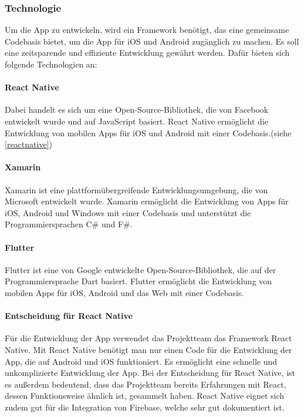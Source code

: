 \subsubsection{Technologie}
Um die App zu entwickeln, wird ein \Gls{Framework} benötigt, das eine gemeinsame Codebasis bietet, um die App für iOS und Android zugänglich zu machen. Es soll eine zeitsparende und effiziente Entwicklung gewährt werden. Dafür bieten sich folgende Technologien an:\\

\paragraph{React Native}Dabei handelt es sich um eine \Gls{Open-Source}-Bibliothek, die von Facebook entwickelt wurde und auf JavaScript basiert. React Native ermöglicht die Entwicklung von mobilen Apps für iOS und Android mit einer Codebasis.(siehe \ref*{reactnative})
\paragraph{Xamarin} Xamarin ist eine plattformübergreifende Entwicklungsumgebung, die von Microsoft entwickelt wurde. Xamarin ermöglicht die Entwicklung von Apps für iOS, Android und Windows mit einer Codebasis und unterstützt die Programmiersprachen C\# und F\#. \cite{vergleich}
\paragraph{Flutter} Flutter ist eine von Google entwickelte \Gls{Open-Source}-Bibliothek, die auf der Programmiersprache Dart basiert. Flutter ermöglicht die Entwicklung von mobilen Apps für iOS, Android und das Web mit einer Codebasis.\cite{flutter}


\paragraph{Entscheidung für React Native}Für die Entwicklung der App verwendet das Projektteam das Framework React Native. Mit React Native benötigt man nur einen Code für die Entwicklung der App, die auf Android und iOS funktioniert. Es ermöglicht eine schnelle und unkomplizierte Entwicklung der App. Bei der Entscheidung für React Native, ist es außerdem bedeutend, dass das Projektteam bereits Erfahrungen mit React, dessen Funktionsweise ähnlich ist, gesammelt haben. React Native eignet sich zudem gut für die Integration von Firebase, welche sehr gut dokumentiert ist.\cite{reactnative}\\

